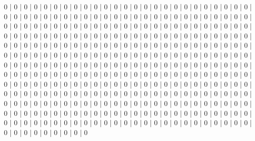 \documentclass[parskip=half]{scrartcl}
\begin{document}
0 | 0 | 0 | 0 | 0 | 0 | 0 | 0 | 0 | 0 | 0 | 0 | 0 | 0 | 0 | 0 | 0 | 0 | 0 | 0 | 0 | 0 | 0 | 0 | 0 | 0 | 0 | 0 | 0 | 0 | 0 | 0 | 0 | 0 | 0 | 0 | 0 | 0 | 0 | 0 | 0 | 0 | 0 | 0 | 0 | 0 | 0 | 0 | 0 | 0 | 0 | 0 | 0 | 0 | 0 | 0 | 0 | 0 | 0 | 0 | 0 | 0 | 0 | 0 | 0 | 0 | 0 | 0 | 0 | 0 | 0 | 0 | 0 | 0 | 0 | 0 | 0 | 0 | 0 | 0 | 0 | 0 | 0 | 0 | 0 | 0 | 0 | 0 | 0 | 0 | 0 | 0 | 0 | 0 | 0 | 0 | 0 | 0 | 0 | 0 | 0 | 0 | 0 | 0 | 0 | 0 | 0 | 0 | 0 | 0 | 0 | 0 | 0 | 0 | 0 | 0 | 0 | 0 | 0 | 0 | 0 | 0 | 0 | 0 | 0 | 0 | 0 | 0 | 0 | 0 | 0 | 0 | 0 | 0 | 0 | 0 | 0 | 0 | 0 | 0 | 0 | 0 | 0 | 0 | 0 | 0 | 0 | 0 | 0 | 0 | 0 | 0 | 0 | 0 | 0 | 0 | 0 | 0 | 0 | 0 | 0 | 0 | 0 | 0 | 0 | 0 | 0 | 0 | 0 | 0 | 0 | 0 | 0 | 0 | 0 | 0 | 0 | 0 | 0 | 0 | 0 | 0 | 0 | 0 | 0 | 0 | 0 | 0 | 0 | 0 | 0 | 0 | 0 | 0 | 0 | 0 | 0 | 0 | 0 | 0 | 0 | 0 | 0 | 0 | 0 | 0 | 0 | 0 | 0 | 0 | 0 | 0 | 0 | 0 | 0 | 0 | 0 | 0 | 0 | 0 | 0 | 0 | 0 | 0 | 0 | 0 | 0 | 0 | 0 | 0 | 0 | 0 | 0 | 0 | 0 | 0 | 0 | 0 | 0 | 0 | 0 | 0 | 0 | 0 | 0 | 0 | 0 | 0 | 0 | 0 | 0 | 0 | 0 | 0 | 0 | 0 | 0 | 0 | 0 | 0 | 0 | 0 | 0 | 0 | 0 | 0 | 0 | 0 | 0 | 0 | 0 | 0 | 0 | 0 | 0 | 0 | 0 | 0 | 0 | 0 | 0 | 0 | 0 | 0 | 0 | 0 | 0 | 0 | 0 | 0 | 0 | 0 | 0 | 0 | 0 | 0 | 0 | 0 | 0 | 0 | 0 | 0 | 0 | 0 | 0 | 0 | 0 | 0 | 0 | 0 | 0 | 0 | 0 | 0 | 0 | 0 | 0 | 0 | 0 | 0 | 0 | 0 | 0 | 0 | 0 | 0 | 0 | 0 | 0 | 0 | 0 | 0 | 0 | 0\\
\end{document}
